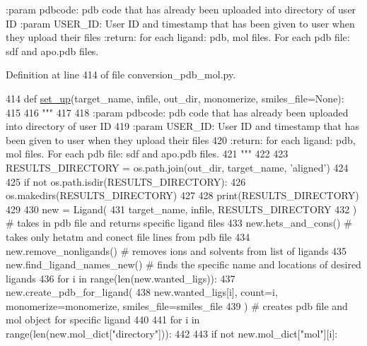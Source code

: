 \begin{DoxyVerb}:param pdbcode: pdb code that has already been uploaded into directory of user ID
:param USER_ID: User ID and timestamp that has been given to user when they upload their files
:return: for each ligand: pdb, mol files. For each pdb file: sdf and apo.pdb files.
\end{DoxyVerb}
 

Definition at line 414 of file conversion\+\_\+pdb\+\_\+mol.\+py.


\begin{DoxyCode}
414 \textcolor{keyword}{def }\hyperlink{namespacefragalysis__api_1_1xcimporter_1_1conversion__pdb__mol_ab8fa8ff14ff0439b99603cbbd33472e2}{set\_up}(target\_name, infile, out\_dir, monomerize, smiles\_file=None):
415 
416     \textcolor{stringliteral}{"""}
417 \textcolor{stringliteral}{}
418 \textcolor{stringliteral}{    :param pdbcode: pdb code that has already been uploaded into directory of user ID}
419 \textcolor{stringliteral}{    :param USER\_ID: User ID and timestamp that has been given to user when they upload their files}
420 \textcolor{stringliteral}{    :return: for each ligand: pdb, mol files. For each pdb file: sdf and apo.pdb files.}
421 \textcolor{stringliteral}{    """}
422 
423     RESULTS\_DIRECTORY = os.path.join(out\_dir, target\_name, \textcolor{stringliteral}{'aligned'})
424 
425     \textcolor{keywordflow}{if} \textcolor{keywordflow}{not} os.path.isdir(RESULTS\_DIRECTORY):
426         os.makedirs(RESULTS\_DIRECTORY)
427 
428     print(RESULTS\_DIRECTORY)
429 
430     new = Ligand(
431         target\_name, infile, RESULTS\_DIRECTORY
432     )  \textcolor{comment}{# takes in pdb file and returns specific ligand files}
433     new.hets\_and\_cons()  \textcolor{comment}{# takes only hetatm and conect file lines from pdb file}
434     new.remove\_nonligands()  \textcolor{comment}{# removes ions and solvents from list of ligands}
435     new.find\_ligand\_names\_new()  \textcolor{comment}{# finds the specific name and locations of desired ligands}
436     \textcolor{keywordflow}{for} i \textcolor{keywordflow}{in} range(len(new.wanted\_ligs)):
437         new.create\_pdb\_for\_ligand(
438             new.wanted\_ligs[i], count=i, monomerize=monomerize, smiles\_file=smiles\_file
439         )  \textcolor{comment}{# creates pdb file and mol object for specific ligand}
440 
441     \textcolor{keywordflow}{for} i \textcolor{keywordflow}{in} range(len(new.mol\_dict[\textcolor{stringliteral}{"directory"}])):
442 
443         \textcolor{keywordflow}{if} \textcolor{keywordflow}{not} new.mol\_dict[\textcolor{stringliteral}{"mol"}][i]:

\end{DoxyCode}

